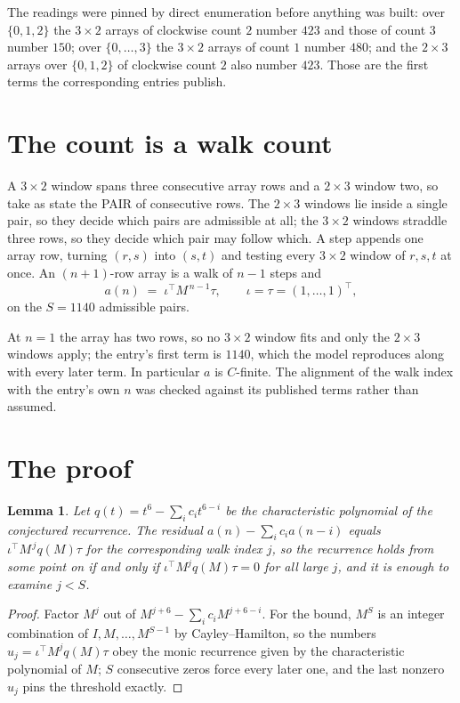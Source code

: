 \documentclass[11pt,a4paper]{article}
\theoremstyle{plain}
\newtheorem{lemma}[theorem]{Lemma}
\theoremstyle{definition}
\begin{document}
The readings were pinned by direct enumeration before anything was built: over
$\{0,1,2\}$ the $3\times2$ arrays of clockwise count $2$ number $423$ and those of count
$3$ number $150$; over $\{0,\dots,3\}$ the $3\times2$ arrays of count $1$ number $480$;
and the $2\times3$ arrays over $\{0,1,2\}$ of clockwise count $2$ also number $423$. Those
are the first terms the corresponding entries publish.

\section{The count is a walk count}

A $3\times2$ window spans three consecutive array rows and a $2\times3$
window two, so take as state the PAIR of consecutive rows. The $2\times3$ windows lie inside a
single pair, so they decide which pairs are admissible at all; the $3\times2$ windows straddle
three rows, so they decide which pair may follow which. A step appends one array row, turning
$(r,s)$ into $(s,t)$ and testing every $3\times2$ window of $r,s,t$ at once. An $(n+1)$-row
array is a walk of $n-1$ steps and
\[
a(n)\;=\;\iota^{\!\top}M^{\,n-1}\tau,\qquad\iota=\tau=(1,\dots,1)^{\!\top},
\]
on the $S=1140$ admissible pairs.

At $n=1$ the array has two rows, so no $3\times2$ window fits and only the
$2\times3$ windows apply; the entry's first term is
$1140$, which the model reproduces along with every later term.
In particular $a$ is $C$-finite. The alignment of the walk index with the entry's own $n$ was
checked against its published terms rather than assumed.

\section{The proof}

\begin{lemma}\label{lem:crit}
Let $q(t)=t^{6}-\sum_i c_it^{6-i}$ be the characteristic polynomial of the
conjectured recurrence. The residual $a(n)-\sum_ic_ia(n-i)$ equals
$\iota^{\!\top}M^{\,j}q(M)\tau$ for the corresponding walk index $j$, so the recurrence
holds from some point on if and only if $\iota^{\!\top}M^{j}q(M)\tau=0$ for all large $j$,
and it is enough to examine $j<S$.
\end{lemma}

\begin{proof}
Factor $M^{j}$ out of $M^{j+6}-\sum_ic_iM^{j+6-i}$. For the bound, $M^{S}$
is an integer combination of $I,M,\dots,M^{S-1}$ by Cayley--Hamilton, so the numbers
$u_j=\iota^{\!\top}M^{j}q(M)\tau$ obey the monic recurrence given by the characteristic
polynomial of $M$; $S$ consecutive zeros force every later one, and the last nonzero $u_j$
pins the threshold exactly.
\end{proof}
\end{document}
